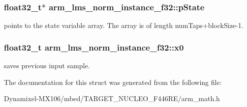 \subsubsection[{\texorpdfstring{p\+State}{pState}}]{\setlength{\rightskip}{0pt plus 5cm}float32\+\_\+t$\ast$ arm\+\_\+lms\+\_\+norm\+\_\+instance\+\_\+f32\+::p\+State}\hypertarget{structarm__lms__norm__instance__f32_a0bc03338687002ed5f2e4a363eb095ec}{}\label{structarm__lms__norm__instance__f32_a0bc03338687002ed5f2e4a363eb095ec}
points to the state variable array. The array is of length num\+Taps+block\+Size-\/1. 
\subsubsection[{\texorpdfstring{x0}{x0}}]{\setlength{\rightskip}{0pt plus 5cm}float32\+\_\+t arm\+\_\+lms\+\_\+norm\+\_\+instance\+\_\+f32\+::x0}\hypertarget{structarm__lms__norm__instance__f32_aec958fe89b164a30f38bcca9f5d96218}{}\label{structarm__lms__norm__instance__f32_aec958fe89b164a30f38bcca9f5d96218}
saves previous input sample. 

The documentation for this struct was generated from the following file\+:\begin{DoxyCompactItemize}
\item 
Dynamixel-\/\+M\+X106/mbed/\+T\+A\+R\+G\+E\+T\+\_\+\+N\+U\+C\+L\+E\+O\+\_\+\+F446\+R\+E/arm\+\_\+math.\+h\end{DoxyCompactItemize}
